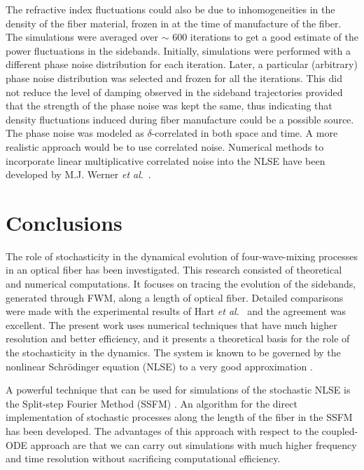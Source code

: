 The refractive index fluctuations could also be due to inhomogeneities in the 
density of the fiber material, frozen in at the time of manufacture of the 
fiber. The simulations were averaged over $\sim$ 600 iterations to get a good 
estimate of the power fluctuations in the sidebands. Initially, simulations 
were performed with a different phase noise distribution for each iteration. 
Later, a particular (arbitrary) phase noise distribution was selected and 
frozen for all the iterations.
This did not reduce the level of damping observed in the sideband trajectories 
provided that the strength of the phase noise was kept the same, thus 
indicating that density fluctuations induced during fiber manufacture could be 
a possible source. The phase noise was modeled as $\delta$-correlated in
both space and time. A more realistic approach would be to use correlated
noise. Numerical methods to incorporate linear multiplicative correlated noise 
into the NLSE have been developed by M.J. Werner {\it et al}.\ \cite{werner2}.

\section{Conclusions}

The role of stochasticity in the dynamical evolution of four-wave-mixing 
processes in an optical fiber has been investigated. This research consisted 
of theoretical and numerical computations. It focuses on tracing the evolution 
of the sidebands, generated through FWM, along a length of optical fiber. 
Detailed comparisons were made with the experimental results of 
Hart {\it et al}.\ \cite{hart1} and the agreement was excellent. The present work 
uses numerical techniques that have much higher resolution and better 
efficiency, and it presents a theoretical basis for the role of the 
stochasticity in the dynamics. The system is known to be governed by the 
nonlinear Schr\"odinger equation (NLSE) to a very good 
approximation \cite{Agrawal2}. 

A powerful technique that can be used for simulations of the stochastic NLSE 
is the Split-step Fourier Method (SSFM) \cite{Agrawal2}. An algorithm for the 
direct implementation of stochastic processes along the length of the fiber in 
the SSFM has been developed. The advantages of this approach with respect to 
the coupled-ODE approach are that we can carry out simulations with much 
higher frequency and time resolution without sacrificing computational 
efficiency.
 
